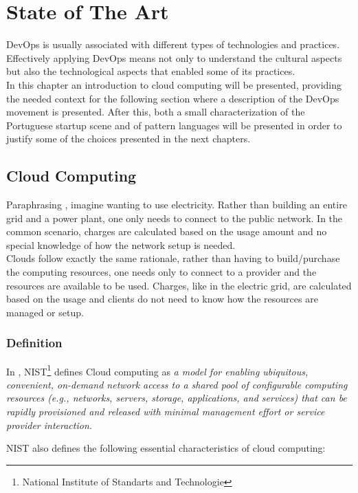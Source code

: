 \chapter{State of The Art} \label{chap:stateoftheart}
DevOps is usually associated with different types of technologies and practices. Effectively applying DevOps means not only to understand the cultural aspects but also the technological aspects that enabled some of its practices. \\
In this chapter an introduction to cloud computing will be presented, providing the needed context for the following section where a description of the DevOps movement is presented. After this, both a small characterization of the Portuguese startup scene and of pattern languages will be presented in order to justify some of the choices presented in the next chapters.

    \section{Cloud Computing} \label{chap:stateoftheart:sec:cloud}
    Paraphrasing \cite{Bass}, imagine  wanting to use electricity. Rather than building an entire grid and a power plant, one only needs to connect to the public network. In the common scenario, charges are calculated based on the usage amount and no special knowledge of how the network setup is needed.\\
    Clouds follow exactly the same rationale, rather than having to build/purchase the computing resources, one needs only to connect to a provider and the resources are available to be used. Charges, like in the electric grid, are calculated based on the usage and clients do not need to know how the resources are managed or setup.
        \subsection{Definition}
        In \cite{Mell2011}, NIST\footnote{National Institute of Standarts and Technologie} defines Cloud computing as \textit{a model for enabling ubiquitous, convenient, on-demand network access to a shared pool of configurable computing resources (e.g., networks, servers, storage, applications, and services) that can be rapidly provisioned and released with minimal management effort or service provider interaction.}

        NIST also defines the following essential characteristics of cloud computing:

